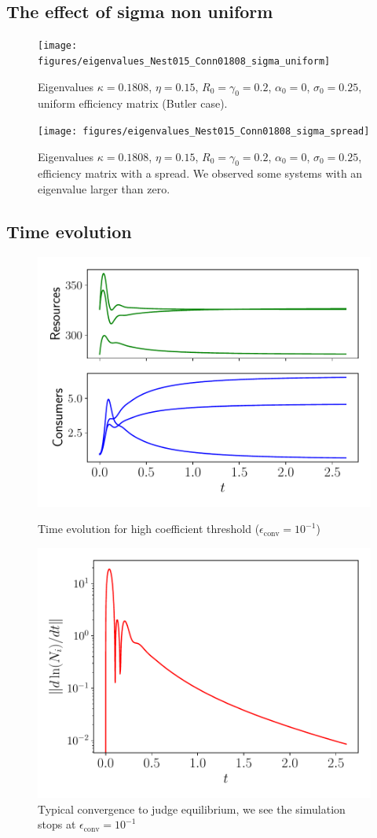 \documentclass[12pt, titlepage]{report}
\begin{document}
\subsection{The effect of sigma non uniform}
\begin{figure}
\texttt{[image: figures/eigenvalues\_Nest015\_Conn01808\_sigma\_uniform]}
\caption{Eigenvalues $\kappa=0.1808$, $\eta=0.15$, $R_0=\gamma_0=0.2$, $\alpha_0=0$, $\sigma_0=0.25$, uniform efficiency matrix (Butler case).}
\texttt{[image: figures/eigenvalues\_Nest015\_Conn01808\_sigma\_spread]}
\caption{Eigenvalues $\kappa=0.1808$, $\eta=0.15$, $R_0=\gamma_0=0.2$, $\alpha_0=0$, $\sigma_0=0.25$, efficiency matrix with a spread. We observed some systems with an eigenvalue larger than zero.}
\end{figure}

\subsection{Time evolution}
\begin{figure}[h!]
\centering
\includegraphics[width=0.6\linewidth]{Typical_time_evolution/Typical_time_evolution_resources_species_high_threshold.pdf}
\caption{Time evolution for high coefficient threshold ($\epsilon_{\text{conv}}=10^{-1}$)}
\includegraphics[width=0.6\linewidth]{figures/Typical_time_evolution/Typical_time_evolution_log_derivative_high_threshold.pdf}
\caption{Typical convergence to judge equilibrium, we see the simulation stops at $\epsilon_{\text{conv}}=10^{-1}$}
\end{figure}
\end{document}
